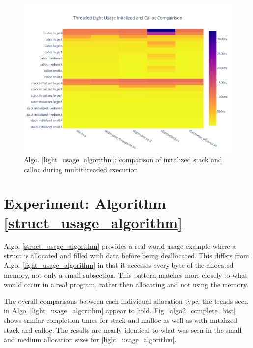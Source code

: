 \documentclass[letterpaper, 10 pt, conference]{ieeeconf}  %
\begin{document}
\begin{figure}[tbh!]
  \centering
  \includegraphics[width=\columnwidth]{graphs/light_init_calloc_threaded_hist.png}
  \caption{ Algo. \ref{light_usage_algorithm}: comparison of initalized stack and calloc during multithreaded execution }
  \label{algo1_init_calloc_threaded_hist}
\end{figure}

\section{Experiment: Algorithm \ref{struct_usage_algorithm}}

Algo. \ref{struct_usage_algorithm} provides a real world usage example where a struct is allocated and filled with data before being deallocated.
This differs from Algo. \ref{light_usage_algorithm} in that it accesses every byte of the allocated memory, not only a small subsection.
This pattern matches more closely to what would occur in a real program, rather then allocating and not using the memory.

The overall comparisons between each individual allocation type, the trends seen in Algo. \ref{light_usage_algorithm} appear to hold.
Fig. \ref{algo2_complete_hist} shows similar completion times for stack and malloc as well as with initalized stack and calloc.
The results are nearly identical to what was seen in the small and medium allocation sizes for \ref{light_usage_algorithm}.
\end{document}
